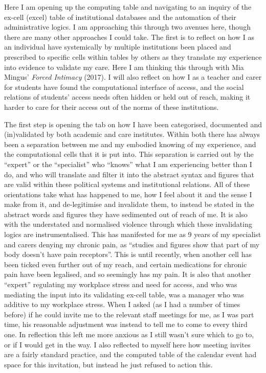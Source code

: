 Here I am opening up the computing table and navigating to an inquiry of
the ex-cell (excel) table of institutional databases and the automation
of their administrative logics. I am approaching this through two
avenues here, though there are many other approaches I could take. The
first is to reflect on how I as an individual have systemically by
multiple institutions been placed and prescribed to specific cells
within tables by others as they translate my experience into evidence to
validate my care. Here I am thinking this through with Mia Mingus'
\emph{Forced Intimacy} (2017). I will also reflect on how I as a teacher
and carer for students have found the computational interface of access,
and the social relations of students' access needs often hidden or held
out of reach, making it harder to care for their access out of the norms
of these institutions.

The first step is opening the tab on how I have been categorised,
documented and (in)validated by both academic and care institutes.
Within both there has always been a separation between me and my
embodied knowing of my experience, and the computational cells that it
is put into. This separation is carried out by the ``expert'' or the
``specialist'' who ``knows'' what I am experiencing better than I do,
and who will translate and filter it into the abstract syntax and
figures that are valid within these political systems and institutional
relations. All of these orientations take what has happened to me, how I
feel about it and the sense I make from it, and de-legitimise and
invalidate them, to instead be stated in the abstract words and figures
they have sedimented out of reach of me. It is also with the understated
and normalised violence through which these invalidating logics are
instrumentalised. This has manifested for me as 9 years of my specialist
and carers denying my chronic pain, as ``studies and figures show that
part of my body doesn't have pain receptors''. This is until recently,
when another cell has been ticked even further out of my reach, and
certain medications for chronic pain have been legalised, and so
seemingly has my pain. It is also that another ``expert'' regulating my
workplace stress and need for access, and who was mediating the input
into its validating ex-cell table, was a manager who was additive to my
workplace stress. When I asked (as I had a number of times before) if he
could invite me to the relevant staff meetings for me, as I was part
time, his reasonable adjustment was instead to tell me to come to every
third one. In reflection this left me more anxious as I still wasn't
sure which to go to, or if I would get in the way. I also reflected to
myself here how meeting invites are a fairly standard practice, and the
computed table of the calendar event had space for this invitation, but
instead he just refused to action this.

